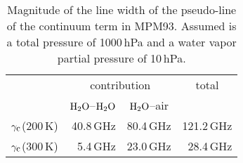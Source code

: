 \begin{table}[!htb]
\begin{center}
\begin{tabular}{lrrr}
\hline
 & \multicolumn{2}{c}{contribution} & \multicolumn{1}{c}{total} \\
 & \multicolumn{1}{c}{$\mbox{H}_2\mbox{O}$--$\mbox{H}_2\mbox{O}$} & \multicolumn{1}{c}{$\mbox{H}_2\mbox{O}$--air} & \\
\hline
$\gamma_{\mbox{\rm \small c}}$(200\,K) & 40.8\,GHz & 80.4\,GHz & 121.2\,GHz\\
$\gamma_{\mbox{\rm \small c}}$(300\,K) &  5.4\,GHz & 23.0\,GHz &  28.4\,GHz\\
\hline
\end{tabular}
\caption{Magnitude of the line width of the pseudo-line of the
  continuum term in MPM93. Assumed is a total pressure of 1000\,hPa
  and a water vapor partial pressure of 10\,hPa.}
\label{tab:mpm_psl_broad}
\end{center}
\end{table} 

